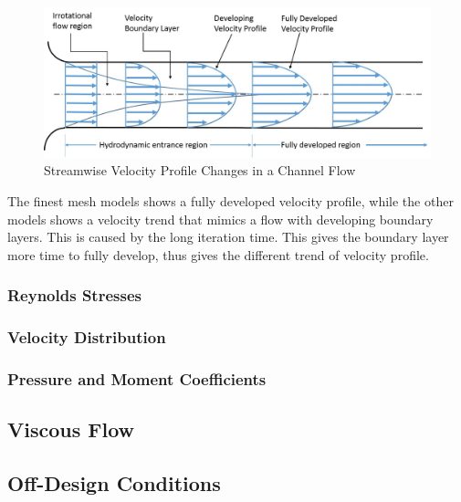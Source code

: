 \pagebreak

\begin{figure}[h!]
	\centering
	\includegraphics[width=0.9\linewidth]{Figures/chanflowveloprof}
	\caption[Streamwise Velocity Changes in a Channel Flow]{Streamwise Velocity Profile Changes in a Channel Flow~\cite{Cengel2019}}
	\label{fig:chanflowveloprof}
\end{figure}


 The finest mesh models shows a fully developed velocity profile, while the other models shows a velocity trend that mimics a flow with developing boundary layers. This is caused by the long iteration time. This gives the boundary layer more time to fully develop, thus gives the different trend of velocity profile.




\subsubsection{Reynolds Stresses}
\label{sec:Reystress}



\subsubsection{Velocity Distribution}
\label{sec:Flow physics}


\subsubsection{Pressure and Moment Coefficients}
\label{sec:Pressure coefficient}



\subsection{Viscous Flow}
\label{sec:ViscFlow}



\subsection{Off-Design Conditions}
\label{sec:ODC}


